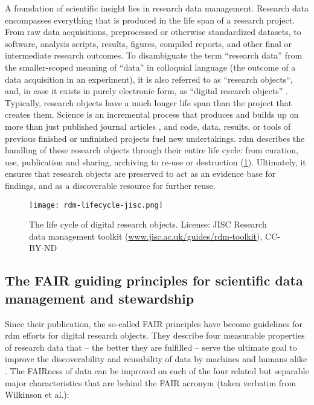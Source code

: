 A foundation of scientific insight lies in research data management.
Research data encompasses everything that is produced in the life span of a research project.
From raw data acquisitions, preprocessed or otherwise standardized datasets, to software, analysis scripts, results, figures, compiled reports, and other final or intermediate research outcomes.
To disambiguate the term ``research data'' from the smaller-scoped meaning of ``data'' in colloquial language (the outcome of a data acquisition in an experiment), it is also referred to as ``research objects``, and, in case it exists in purely electronic form, as ``digital research objects'' \citep{bechhofer2010research}. \\
Typically, research objects have a much longer life span than the project that creates them.
Science is an incremental process that produces and builds up on more than just published journal articles \citep{mons2018data}, and code, data, results, or tools of previous finished or unfinished projects fuel new undertakings.
\gls{rdm} describes the handling of these research objects through their entire life cycle: from curation, use, publication and sharing, archiving to re-use or destruction (\cref{fig:rdm-lifecycle}).
Ultimately, it ensures that research objects are preserved to act as an evidence base for findings, and as a discoverable resource for further reuse.


\begin{figure}[H]
	\centering
	\texttt{[image: rdm-lifecycle-jisc.png]}
	\caption[The life cycle of digital research objects]{The life cycle of digital research objects. License: JISC Research data management toolkit (\href{https://www.jisc.ac.uk/guides/rdm-toolkit}{www.jisc.ac.uk/guides/rdm-toolkit}), CC-BY-ND}
	\label{fig:rdm-lifecycle}
\end{figure}


\subsection{The FAIR guiding principles for scientific data management and stewardship}

Since their publication, the so-called \gls{FAIR} principles \citep{wilkinson2016fair} have become guidelines for \gls{rdm} efforts for digital research objects.
They describe four measurable properties of research data that -- the better they are fulfilled -- serve the ultimate goal to improve the discoverability and reusability of data by machines and humans alike \citep{wilkinson2016fair}.
The \gls{FAIR}ness of data can be improved on each of the four related but separable major characteristics that are behind the \gls{FAIR} acronym (taken verbatim from Wilkinson et al.):

